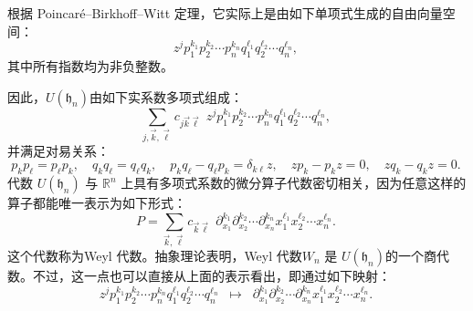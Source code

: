 根据 Poincaré–Birkhoff–Witt 定理，它实际上是由如下单项式生成的自由向量空间：
$$
z^{j} p_{1}^{k_{1}} p_{2}^{k_{2}} \cdots p_{n}^{k_{n}} q_{1}^{\ell_{1}} q_{2}^{\ell_{2}} \cdots q_{n}^{\ell_{n}},~
$$
其中所有指数均为非负整数。

因此，$U(\mathfrak{h}_{n})$由如下实系数多项式组成：
$$
\sum_{j, \vec{k}, \vec{\ell}} c_{j \vec{k} \vec{\ell}} \,\, z^{j} p_{1}^{k_{1}} p_{2}^{k_{2}} \cdots p_{n}^{k_{n}} q_{1}^{\ell_{1}} q_{2}^{\ell_{2}} \cdots q_{n}^{\ell_{n}},~
$$
并满足对易关系：
$$
p_{k} p_{\ell} = p_{\ell} p_{k}, \quad 
q_{k} q_{\ell} = q_{\ell} q_{k}, \quad 
p_{k} q_{\ell} - q_{\ell} p_{k} = \delta_{k\ell} z, \quad 
zp_{k} - p_{k}z = 0, \quad 
zq_{k} - q_{k}z = 0.~
$$
代数 $U(\mathfrak{h}_{n})$ 与 $\mathbb{R}^{n}$ 上具有多项式系数的微分算子代数密切相关，因为任意这样的算子都能唯一表示为如下形式：
$$
P = \sum_{\vec{k}, \vec{\ell}} c_{\vec{k} \vec{\ell}} \,\, 
\partial_{x_{1}}^{k_{1}} \partial_{x_{2}}^{k_{2}} \cdots \partial_{x_{n}}^{k_{n}} 
x_{1}^{\ell_{1}} x_{2}^{\ell_{2}} \cdots x_{n}^{\ell_{n}}.~
$$
这个代数称为Weyl 代数。抽象理论表明，Weyl 代数$W_{n}$ 是 $U(\mathfrak{h}_{n})$的一个商代数。不过，这一点也可以直接从上面的表示看出，即通过如下映射：
$$
z^{j} p_{1}^{k_{1}} p_{2}^{k_{2}} \cdots p_{n}^{k_{n}} q_{1}^{\ell_{1}} q_{2}^{\ell_{2}} \cdots q_{n}^{\ell_{n}}
\;\;\mapsto\;\;
\partial_{x_{1}}^{k_{1}} \partial_{x_{2}}^{k_{2}} \cdots \partial_{x_{n}}^{k_{n}}
x_{1}^{\ell_{1}} x_{2}^{\ell_{2}} \cdots x_{n}^{\ell_{n}}.~
$$

